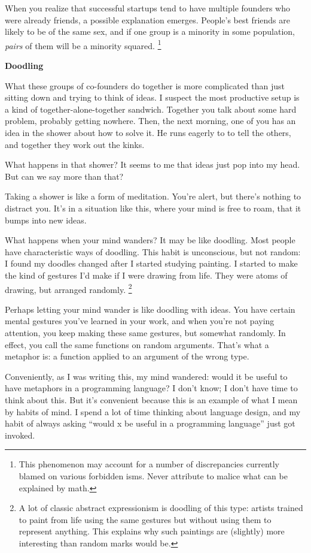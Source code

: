 When you realize that successful startups tend to have multiple founders
who were already friends, a possible explanation emerges. People's best
friends are likely to be of the same sex, and if one group is a minority
in some population, \emph{pairs} of them will be a minority squared.
\footnote{This phenomenon may account for a number of discrepancies
currently blamed on various forbidden isms. Never attribute to malice
what can be explained by math.}

\textbf{Doodling}

What these groups of co-founders do together is more complicated than
just sitting down and trying to think of ideas. I suspect the most
productive setup is a kind of together-alone-together sandwich. Together
you talk about some hard problem, probably getting nowhere. Then, the
next morning, one of you has an idea in the shower about how to solve
it. He runs eagerly to to tell the others, and together they work out
the kinks.

What happens in that shower? It seems to me that ideas just pop into my
head. But can we say more than that?

Taking a shower is like a form of meditation. You're alert, but there's
nothing to distract you. It's in a situation like this, where your mind
is free to roam, that it bumps into new ideas.

What happens when your mind wanders? It may be like doodling. Most
people have characteristic ways of doodling. This habit is unconscious,
but not random: I found my doodles changed after I started studying
painting. I started to make the kind of gestures I'd make if I were
drawing from life. They were atoms of drawing, but arranged randomly.
\footnote{A lot of classic abstract expressionism is doodling of this
type: artists trained to paint from life using the same gestures but
without using them to represent anything. This explains why such
paintings are (slightly) more interesting than random marks would be.}

Perhaps letting your mind wander is like doodling with ideas. You have
certain mental gestures you've learned in your work, and when you're not
paying attention, you keep making these same gestures, but somewhat
randomly. In effect, you call the same functions on random arguments.
That's what a metaphor is: a function applied to an argument of the
wrong type.

Conveniently, as I was writing this, my mind wandered: would it be
useful to have metaphors in a programming language? I don't know; I
don't have time to think about this. But it's convenient because this is
an example of what I mean by habits of mind. I spend a lot of time
thinking about language design, and my habit of always asking ``would x
be useful in a programming language'' just got invoked.

